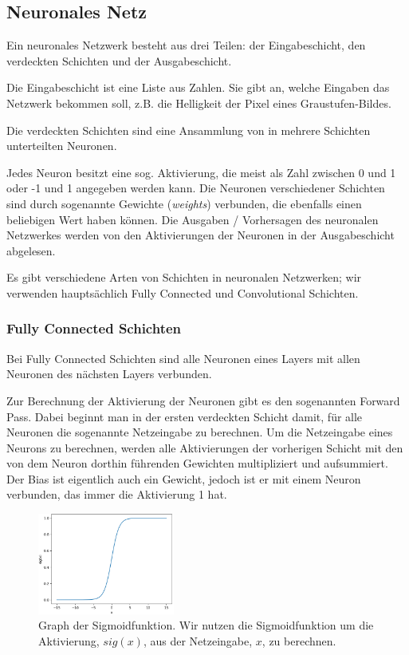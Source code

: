 \documentclass[10pt]{article}
\newcommand{\threesub}[1]{
    \vspace{1.5ex}
    \noindent {\textbf{#1}}
    \vspace{0.5ex}
}
\newcommand{\eng}[1]{\textit{#1}}
\newcommand{\feng}[1]{{#1}}
\begin{document}
\subsection{Neuronales Netz}

Ein neuronales Netzwerk besteht aus drei Teilen: der Eingabeschicht, den verdeckten Schichten und der Ausgabeschicht. 

Die Eingabeschicht ist eine Liste aus Zahlen. 
Sie gibt an, welche Eingaben das Netzwerk bekommen soll, z.B. die Helligkeit der Pixel eines Graustufen-Bildes.

Die verdeckten Schichten sind eine Ansammlung von in mehrere Schichten unterteilten Neuronen.

Jedes Neuron besitzt eine sog. Aktivierung, die meist als Zahl zwischen 0 und 1 oder -1 und 1 angegeben werden kann. 
Die Neuronen verschiedener Schichten sind durch sogenannte Gewichte (\eng{weights}) verbunden, die ebenfalls einen beliebigen Wert haben können.
Die Ausgaben / Vorhersagen des neuronalen Netzwerkes werden von den Aktivierungen der Neuronen in der Ausgabeschicht abgelesen.

Es gibt verschiedene Arten von Schichten in neuronalen Netzwerken; wir verwenden hauptsächlich \feng{Fully Connected} und \feng{Convolutional} Schichten.

\subsubsection{Fully Connected Schichten} 
\threesub{{Forward pass}} \label{forward-prop}

Bei Fully Connected Schichten sind alle Neuronen eines Layers mit allen Neuronen des nächsten Layers verbunden.

Zur Berechnung der Aktivierung der Neuronen gibt es den sogenannten \feng{Forward Pass}. 
Dabei beginnt man in der ersten verdeckten Schicht damit, für alle Neuronen die sogenannte Netzeingabe zu berechnen. 
Um die Netzeingabe eines Neurons zu berechnen, werden alle Aktivierungen der vorherigen Schicht mit den von dem Neuron dorthin führenden Gewichten multipliziert und aufsummiert.
Der Bias ist eigentlich auch ein Gewicht, jedoch ist er mit einem Neuron verbunden, das immer die Aktivierung 1 hat. \cite{brotcrunsher:forwardpass}

\begin{figure}
	\centering
	\vspace*{-5mm}
	\includegraphics[width=0.4\textwidth]{pictures/sig_func.png}
	\caption{Graph der Sigmoidfunktion. Wir nutzen die Sigmoidfunktion um die Aktivierung, $sig(x)$, aus der Netzeingabe, $x$, zu berechnen.}
	\label{sig_func}
\end{figure}
\end{document}
